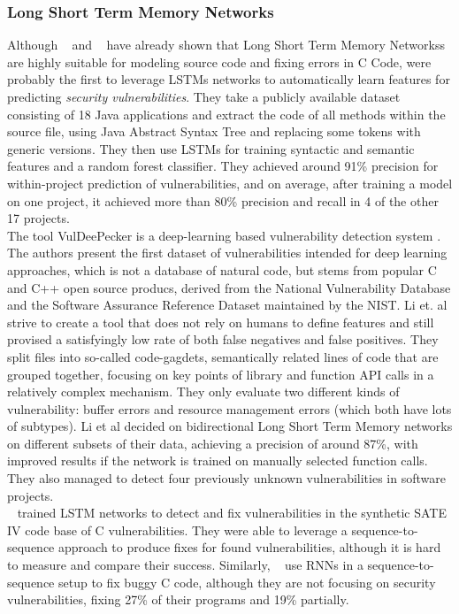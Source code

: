 \documentclass[
	a4paper,
	pagesize,
	pdftex,
	12pt,
	twoside, %
	BCOR=5mm, %
	ngerman,
	fleqn,
	final,
	]{scrartcl}
\begin{document}
\subsubsection{Long Short Term Memory Networks}
Although ~\cite{Gupta.2017b} and ~\cite{Dam.2016b} have already shown that Long Short Term Memory Networkss are highly suitable for modeling source code and fixing errors in C Code, \cite{Dam.2017} were probably the first to leverage LSTMs networks to automatically learn features for predicting \textit{security vulnerabilities}. They take a publicly available dataset consisting of 18 Java applications and extract the code of all methods within the source file, using Java Abstract Syntax Tree and replacing some tokens with generic versions. They then use LSTMs for training syntactic and semantic features and a random forest classifier. They achieved around 91\% precision for within-project prediction of vulnerabilities, and on average, after training a model on one project, it achieved more than 80\% precision and recall in 4 of the other 17 projects.\\
The tool VulDeePecker is a deep-learning based vulnerability detection system \cite{Li.2018}. The authors present the first dataset of vulnerabilities intended for deep learning approaches, which is not a database of natural code, but stems from popular C and C++ open source producs, derived from the National Vulnerability Database and the Software Assurance Reference Dataset maintained by the NIST. Li et. al strive to create a tool that does not rely on humans to define features and still provised a satisfyingly low rate of both false negatives and false positives. They split files into so-called code-gagdets, semantically related lines of code that are grouped together, focusing on key points of library and function API calls in a relatively complex mechanism. They only evaluate two different kinds of vulnerability: buffer errors and resource management errors (which both have lots of subtypes). Li et al decided on bidirectional Long Short Term Memory networks on different subsets of their data, achieving a precision of around 87\%, with improved results if the network is trained on manually selected function calls. They also managed to detect four previously unknown vulnerabilities in software projects. \\
~\cite{Harer.2018} trained LSTM networks to detect and fix vulnerabilities in the synthetic SATE IV code base of C vulnerabilities. They were able to leverage a sequence-to-sequence approach to produce fixes for found vulnerabilities, although it is hard to measure and compare their success. Similarly, ~\cite{Gupta.2017} use RNNs in a sequence-to-sequence setup to fix buggy C code, although they are not focusing on security vulnerabilities, fixing 27\% of their programs and 19\% partially.
\end{document}
